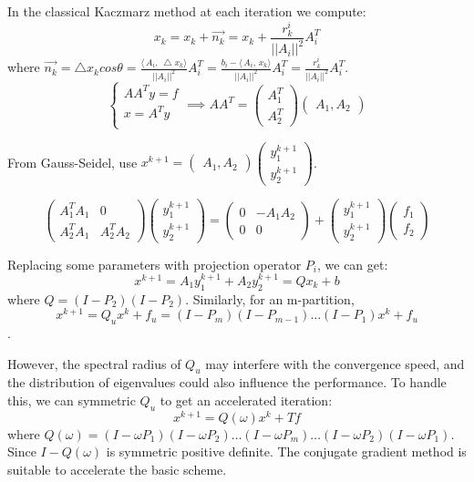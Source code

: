 \documentclass[a4paper,12pt]{article}
\begin{document}
In the classical Kaczmarz method at each iteration we compute:
$$x_k=x_k+\overrightarrow{n_k}=x_k+\frac{r_k^i}{||A_i||^2}A_i^T$$
where  $\overrightarrow{n_k}=\bigtriangleup{x_k}cos\theta=\frac{\langle\,A_i{,}\,\bigtriangleup{x_k}\rangle}{||A_i||^2}A_i^T=\frac{b_i-\langle\,A_i{,}\,x_k\rangle}{||A_i||^2}A_i^T=\frac{r_k^i}{||A_i||^2}A_i^T$.
$$
\left\{
\begin{array}{ll}
                  AA^Ty = f\\
                  x = A^Ty\\
 \end{array}
 \right.
 \implies AA^T = \begin{pmatrix} A_1^T \\ A_2^T \end{pmatrix} \begin{pmatrix} A_1, A_2 \end{pmatrix}
  $$
  
  From Gauss-Seidel, use $x^{k+1} = \begin{pmatrix} A_1, A_2 \end{pmatrix} \begin{pmatrix} y_1^{k+1} \\ y_2^{k+1} \end{pmatrix} $.
  
  $$ \begin{pmatrix} A_1^TA_1 & 0 \\ A_2^T A_1 & A_2^T A_2 \end{pmatrix} \begin{pmatrix} y_1^{k+1} \\ y_2^{k+1} \end{pmatrix} =  \begin{pmatrix} 0 & -A_1A_2 \\ 0 & 0\end{pmatrix} + \begin{pmatrix} y_1^{k+1} \\ y_2^{k+1} \end{pmatrix}\begin{pmatrix} f_1 \\ f_2 \end{pmatrix}$$
  
  Replacing some parameters with projection operator $P_i$, we can get:
  $$x^{k+1} = A_1y_1^{k+1} + A_2y_2^{k+1} = Qx_k +b$$ where $Q = (I-P_2)(I-P_2)$. Similarly, for an m-partition, $$x^{k+1} = Q_u x^k + f_u = (I-P_m)(I-P_{m-1}) \ldots (I-P_1)x^k + f_u$$.
  
  However, the spectral radius of $Q_u$ may interfere with the convergence speed, and the distribution of eigenvalues could also influence the performance. To handle this, we can symmetric $Q_u$ to get an accelerated iteration: 
  $$ x^{k+1} = Q(\omega)x^k + Tf$$ where $Q(\omega) = (I-\omega P_1)(I-\omega P_2) \ldots (I-\omega P_m) \ldots (I-\omega P_2) (I-\omega P_1)$. Since $I-Q(\omega)$ is symmetric positive definite. The conjugate gradient method is suitable to accelerate the basic scheme. 
  
\end{document}
